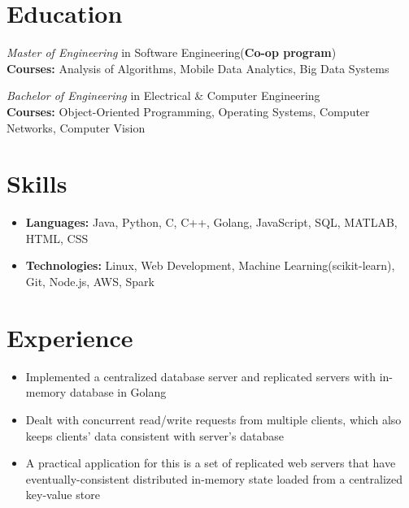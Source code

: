 \documentclass{resume}
\begin{document}



\section{Education}
\textit{Master of Engineering} in Software Engineering(\textbf{Co-op program})\\
\textbf{Courses: }Analysis of Algorithms, Mobile Data Analytics, Big Data Systems

\textit{Bachelor of Engineering} in Electrical \& Computer Engineering\\
\textbf{Courses: }Object-Oriented Programming, Operating Systems, Computer Networks, Computer Vision

\section{Skills}
\begin{itemize}[parsep=0.5ex]
  \item \textbf{Languages: }Java, Python, C, C++, Golang, JavaScript, SQL, MATLAB, HTML, CSS
  \item \textbf{Technologies: }Linux, Web Development, Machine Learning(scikit-learn), Git, Node.js, AWS, Spark
\end{itemize}



\section{Experience}

\begin{itemize}
  \item  Implemented a centralized database server and replicated servers with in-memory database in Golang 
  \item Dealt with concurrent read/write requests from multiple clients, which also keeps clients' data consistent with server's database
  \item A practical application for this is a set of replicated web servers that have eventually-consistent distributed in-memory state loaded from a centralized key-value store
\end{itemize}
\end{document}
